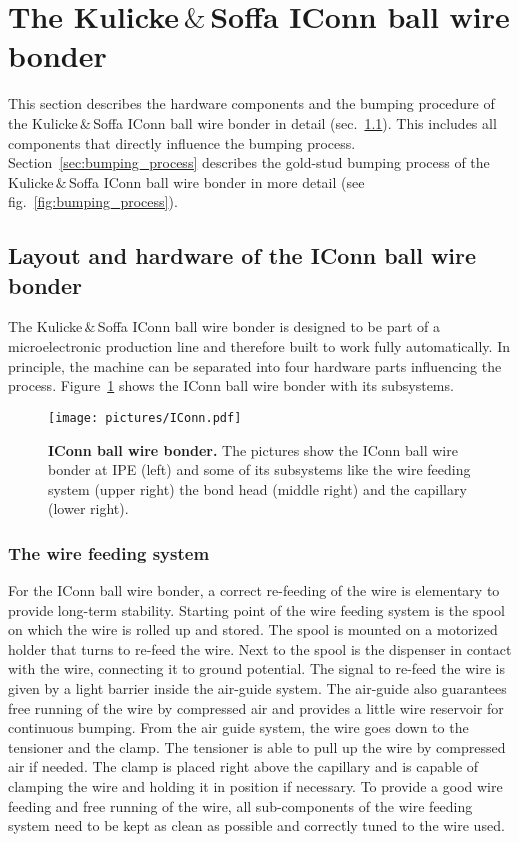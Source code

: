 \section{The Kulicke$\,\&\,$Soffa IConn ball wire bonder}
This section describes the hardware components and the bumping procedure of the Kulicke$\,\&\,$Soffa IConn ball wire bonder in detail (sec.~\ref{sec:IConn_layout}). This includes all components that directly influence the bumping process. Section~\ref{sec:bumping_process} describes the gold-stud bumping process of the Kulicke$\,\&\,$Soffa IConn ball wire bonder in more detail (see fig.~\ref{fig:bumping_process}).

\subsection{Layout and hardware of the IConn ball wire bonder}\label{sec:IConn_layout}
The Kulicke$\,\&\,$Soffa IConn ball wire bonder is designed to be part of a microelectronic production line and therefore built to work fully automatically. In principle, the machine can be separated into four hardware parts influencing the process. Figure~\ref{pic:IConn} shows the IConn ball wire bonder with its subsystems.

\begin{figure}
\begin{center}
\texttt{[image: pictures/IConn.pdf]}
\end{center}
\caption[IConn ball wire bonder]{\textbf{IConn ball wire bonder.} The pictures show the IConn ball wire bonder at \ac{IPE} (left) and some of its subsystems like the wire feeding system (upper right) the bond head (middle right) and the capillary (lower right).}\label{pic:IConn}
\end{figure}

\subsubsection{The wire feeding system}
For the IConn ball wire bonder, a correct re-feeding of the wire is elementary to provide long-term stability. Starting point of the wire feeding system is the spool on which the wire is rolled up and stored. The spool is mounted on a motorized holder that turns to re-feed the wire. Next to the spool is the dispenser in contact with the wire, connecting it to ground potential. The signal to re-feed the wire is given by a light barrier inside the air-guide system. The air-guide also guarantees free running of the wire by compressed air and provides a little wire reservoir for continuous bumping. From the air guide system, the wire goes down to the tensioner and the clamp. The tensioner is able to pull up the wire by compressed air if needed. The clamp is placed right above the capillary and is capable of clamping the wire and holding it in position if necessary. To provide a good wire feeding and free running of the wire, all sub-components of the wire feeding system need to be kept as clean as possible and correctly tuned to the wire used. %

